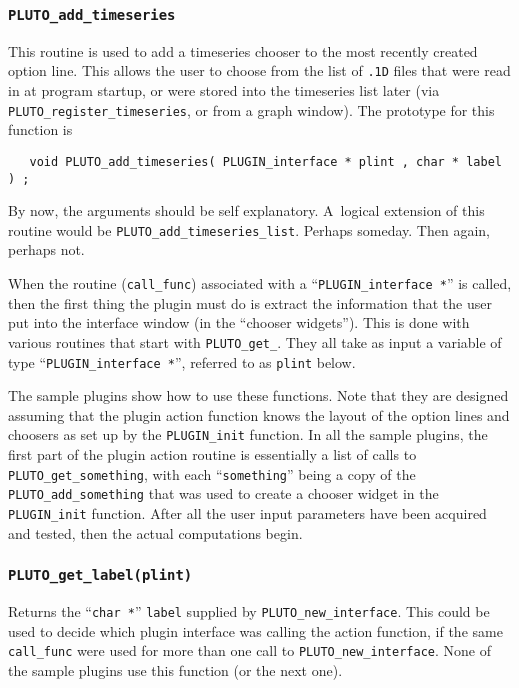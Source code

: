 \subsubsection{{\tt PLUTO\_add\_timeseries}}
This routine is used to add a timeseries chooser to the most
recently created option line.  This allows the user to choose from the
list of {\tt *.1D} files that were read in at program startup, or
were stored into the timeseries list later
(via {\tt PLUTO\_register\_timeseries}, or from a graph window).
The prototype for this function is
\begin{samepage}\begin{verbatim}
   void PLUTO_add_timeseries( PLUGIN_interface * plint , char * label ) ;
\end{verbatim}\end{samepage}
By now, the arguments should be self explanatory.  A~logical extension
of this routine would be {\tt PLUTO\_add\_timeseries\_list}.  Perhaps someday.
Then again, perhaps not.

When the routine ({\tt call\_func}) associated with a
``{\tt PLUGIN\_interface *}'' is called, then the first
thing the plugin must do is extract the information that the user put
into the interface window (in the ``chooser widgets'').
This is done with various routines that start with {\tt PLUTO\_get\_}.
They all take as input a variable of type ``{\tt PLUGIN\_interface *}'',
referred to as {\tt plint} below.

The sample plugins show how to use these functions.  Note that
they are designed assuming that the plugin action function knows the layout
of the option lines and choosers as set up by the {\tt PLUGIN\_init} function.
In all the sample plugins, the first part of the plugin action routine is
essentially a list of calls to {\tt PLUTO\_get\_something}, with each
``{\tt something}'' being a copy of the {\tt PLUTO\_add\_something}
that was used to create a chooser widget in the {\tt PLUGIN\_init} function.
After all the user input parameters have been acquired and tested, then
the actual computations begin.

\subsubsection{{\tt PLUTO\_get\_label(plint)}}
  Returns the ``{\tt char~*}'' {\tt label} supplied by {\tt PLUTO\_new\_interface}.
  This could be used to decide which plugin interface was calling the
  action function, if the same {\tt call\_func} were used for more than
  one call to {\tt PLUTO\_new\_interface}.  None of the sample plugins
  use this function (or the next one).

